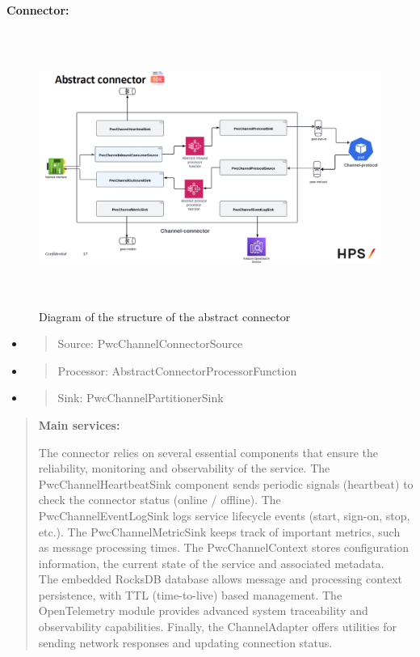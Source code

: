 \documentclass[12pt,a4paper]{report}
\begin{document}
\textbf{Connector:}
\begin{figure}[H]
\centering
\includegraphics[width=6.31605in,height=3.54559in]{media/image31.png}
\caption{Diagram of the
structure of the abstract connector}
\label{fig:hpsTraining}
\end{figure}



\begin{itemize}
\item
  \begin{quote}
  Source: PwcChannelConnectorSource
  \end{quote}
\item
  \begin{quote}
  Processor: AbstractConnectorProcessorFunction
  \end{quote}
\item
  \begin{quote}
  Sink: PwcChannelPartitionerSink
  \end{quote}
\end{itemize}

\begin{quote}
\textbf{Main services:}

The connector relies on several essential components that ensure the
reliability, monitoring and observability of the service. The
PwcChannelHeartbeatSink component sends periodic signals (heartbeat) to
check the connector status (online / offline). The
PwcChannelEventLogSink logs service lifecycle events (start, sign-on,
stop, etc.). The PwcChannelMetricSink keeps track of important metrics,
such as message processing times. The PwcChannelContext stores
configuration information, the current state of the service and
associated metadata.\\
The embedded RocksDB database allows message and processing context
persistence, with TTL (time-to-live) based management. The OpenTelemetry
module provides advanced system traceability and observability
capabilities. Finally, the ChannelAdapter offers utilities for sending
network responses and updating connection status.
\end{quote}
\clearpage
\end{document}
